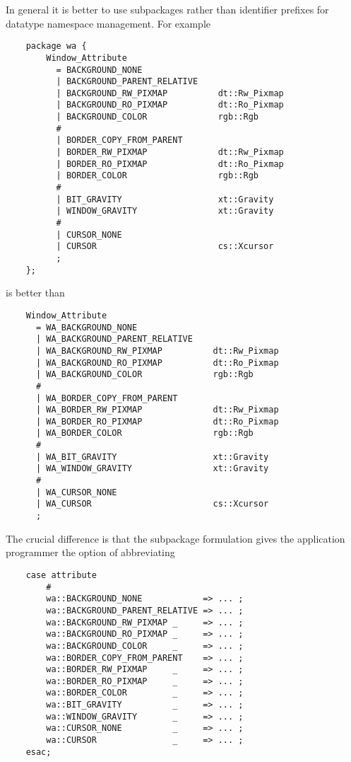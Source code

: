 In general it is better to use subpackages rather than identifier prefixes 
for datatype namespace management.  For example

\begin{verbatim}
    package wa {
        Window_Attribute
          = BACKGROUND_NONE
          | BACKGROUND_PARENT_RELATIVE
          | BACKGROUND_RW_PIXMAP          dt::Rw_Pixmap
          | BACKGROUND_RO_PIXMAP          dt::Ro_Pixmap
          | BACKGROUND_COLOR              rgb::Rgb
          #
          | BORDER_COPY_FROM_PARENT
          | BORDER_RW_PIXMAP              dt::Rw_Pixmap
          | BORDER_RO_PIXMAP              dt::Ro_Pixmap
          | BORDER_COLOR                  rgb::Rgb
          #
          | BIT_GRAVITY                   xt::Gravity
          | WINDOW_GRAVITY                xt::Gravity
          #
          | CURSOR_NONE
          | CURSOR                        cs::Xcursor
          ;
    };
\end{verbatim}

is better than

\begin{verbatim}
    Window_Attribute
      = WA_BACKGROUND_NONE
      | WA_BACKGROUND_PARENT_RELATIVE
      | WA_BACKGROUND_RW_PIXMAP          dt::Rw_Pixmap
      | WA_BACKGROUND_RO_PIXMAP          dt::Ro_Pixmap
      | WA_BACKGROUND_COLOR              rgb::Rgb
      #
      | WA_BORDER_COPY_FROM_PARENT
      | WA_BORDER_RW_PIXMAP              dt::Rw_Pixmap
      | WA_BORDER_RO_PIXMAP              dt::Ro_Pixmap
      | WA_BORDER_COLOR                  rgb::Rgb
      #
      | WA_BIT_GRAVITY                   xt::Gravity
      | WA_WINDOW_GRAVITY                xt::Gravity
      #
      | WA_CURSOR_NONE
      | WA_CURSOR                        cs::Xcursor
      ;
\end{verbatim}

The crucial difference is that the subpackage formulation gives 
the application programmer the option of abbreviating

\begin{verbatim}
    case attribute
        #
        wa::BACKGROUND_NONE            => ... ;
        wa::BACKGROUND_PARENT_RELATIVE => ... ;
        wa::BACKGROUND_RW_PIXMAP _     => ... ;
        wa::BACKGROUND_RO_PIXMAP _     => ... ;
        wa::BACKGROUND_COLOR     _     => ... ;
        wa::BORDER_COPY_FROM_PARENT    => ... ;
        wa::BORDER_RW_PIXMAP     _     => ... ;
        wa::BORDER_RO_PIXMAP     _     => ... ;
        wa::BORDER_COLOR         _     => ... ;
        wa::BIT_GRAVITY          _     => ... ; 
        wa::WINDOW_GRAVITY       _     => ... ;
        wa::CURSOR_NONE          _     => ... ;
        wa::CURSOR               _     => ... ;
    esac;
\end{verbatim}

